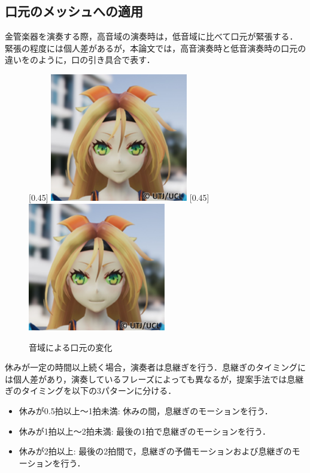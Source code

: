 \newpage
\subsection{口元のメッシュへの適用}
\indent
金管楽器を演奏する際，高音域の演奏時は，低音域に比べて口元が緊張する．
緊張の程度には個人差があるが，本論文では，高音演奏時と低音演奏時の口元の違いをのように，口の引き具合で表す．
\vspace{-2mm}
\begin{figure}[H]
	\centering
	[0.45\linewidth]{
		\includegraphics[width=6cm]{fig/chap3/low.eps}}
	[0.45\linewidth]{
		\includegraphics[width=6cm]{fig/chap3/high.eps}}
	\caption{音域による口元の変化}
	\label{fig:mouth}
\end{figure}
\indent
休みが一定の時間以上続く場合，演奏者は息継ぎを行う．息継ぎのタイミングには個人差があり，演奏しているフレーズによっても異なるが，提案手法では息継ぎのタイミングを以下の3パターンに分ける．
\begin{itemize}
	\item 休みが0.5拍以上～1拍未満: 休みの間，息継ぎのモーションを行う．
	\item 休みが1拍以上～2拍未満: 最後の1拍で息継ぎのモーションを行う．
	\item 休みが2拍以上: 最後の2拍間で，息継ぎの予備モーションおよび息継ぎのモーションを行う．
\end{itemize}


